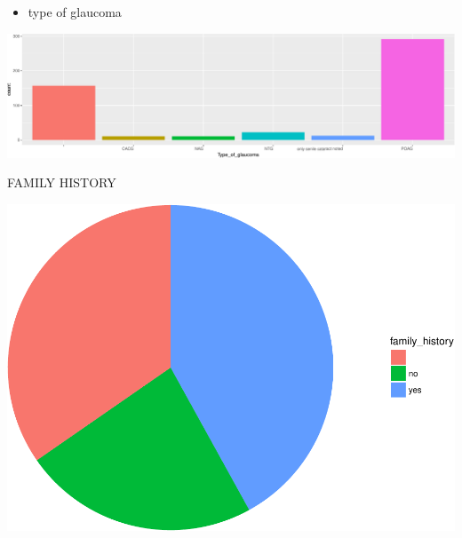 \documentclass[ignorenonframetext,]{beamer}
\providecommand{\tightlist}{%
  \setlength{\itemsep}{0pt}\setlength{\parskip}{0pt}}
\begin{document}
\begin{frame}{}

\begin{itemize}
\tightlist
\item
  type of glaucoma
\end{itemize}

\includegraphics{analisi_exp_markdown_files/figure-beamer/unnamed-chunk-5-1.pdf}

\end{frame}

\begin{frame}{FAMILY HISTORY}

\includegraphics{analisi_exp_markdown_files/figure-beamer/unnamed-chunk-6-1.pdf}

\end{frame}
\end{document}

